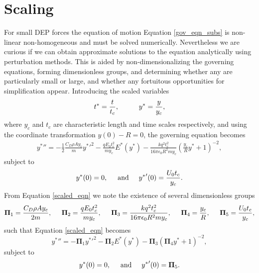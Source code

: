 \documentclass[12pt,a4paper,oneside]{book}
\begin{document}
\section{Scaling}
For small DEP forces the equation of motion Equation \ref{gov_eqn_subs} is non-linear non-homogeneous and must be solved numerically. Nevertheless we are curious if we can obtain approximate solutions to the equation analytically using perturbation methods. This is aided by non-dimensionalizing the governing equations, forming dimensionless groups, and determining whether any are particularly small or large, and whether any fortuitous opportunities for simplification appear. Introducing the scaled variables
\begin{equation}
 t^* = \frac{t}{t_c}, \hspace{10 mm} y^* = \frac{y}{y_c}, \end{equation}
where $y_c$ and $t_c$ are characteristic length and time scales respectively, and using the coordinate transformation $y(0) - R = 0$, the governing equation becomes
\begin{eqnarray}
& {y^*}'' = - \frac{1}{2} \frac{C_D \rho A y_c}{m} {y^*}'^2
- \frac{q E_0 t_c^2}{m y_c} E^* ( {y^*} ) 
- \frac{k q^2 t_c^2}{16 \pi \epsilon_0 R^2 m y_c} \left( \frac{y_c}{R} {y^*} + 1 \right)^{-2}, & \label{scaled_eqn}
\end{eqnarray}
subject to 
\begin{equation*}
{y^*}(0) = 0, \hspace{5 mm} \mbox{and} \hspace{5 mm} {y^*}'(0) = \frac{U_0 t_c}{y_c} .
\end{equation*}
From Equation \ref{scaled_eqn} we note the existence of several dimensionless groups
\[ \mathbf{\Pi}_1 = \frac{C_D \rho A y_c}{2 m}, \hspace{5 mm}
\mathbf{\Pi}_2 = \frac{q E_0 t_c^2}{m y_c}, \hspace{5 mm}
\mathbf{\Pi}_3 = \frac{k q^2 t_c^2}{16 \pi \epsilon_0 R^2 m y_c}, \hspace{5 mm}
\mathbf{\Pi}_4 = \frac{y_c}{R}, \hspace{5 mm}
\mathbf{\Pi}_5 = \frac{U_0 t_c}{y_c},\]
such that Equation \ref{scaled_eqn} becomes
\begin{equation}
\label{pi_terms}
 {y^*}'' = - \mathbf{\Pi}_1 {y^*}'^2
- \mathbf{\Pi}_2 E^* ( {y^*} ) 
- \mathbf{\Pi}_3 \left( \mathbf{\Pi}_4 {y^*} + 1 \right)^{-2},
\end{equation}
subject to
\begin{equation*}
{y^*}(0) = 0, \hspace{5 mm} \mbox{and} \hspace{5 mm} {y^*}'(0) = \mathbf{\Pi}_5 .
\end{equation*}
\end{document}

